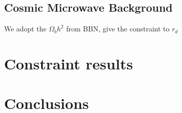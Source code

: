 \documentclass{aa}
\begin{document}
\subsection{Cosmic Microwave Background}

   We adopt the $\Omega_bh^2$ from BBN,
   give the constraint to $r_d$

\section{Constraint results}

\section{Conclusions}



\end{document}

